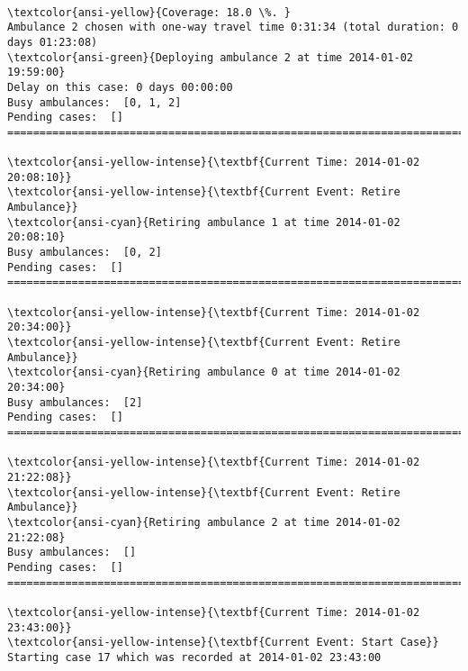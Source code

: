 \documentclass[11pt]{article}
\begin{document}
    \begin{center}
    \end{center}
    { \hspace*{\fill} \\}
    
    \begin{Verbatim}[commandchars=\\\{\}]
\textcolor{ansi-yellow}{Coverage: 18.0 \%. }
Ambulance 2 chosen with one-way travel time 0:31:34 (total duration: 0 days 01:23:08)
\textcolor{ansi-green}{Deploying ambulance 2 at time 2014-01-02 19:59:00}
Delay on this case: 0 days 00:00:00
Busy ambulances:  [0, 1, 2]
Pending cases:  []
========================================================================

\textcolor{ansi-yellow-intense}{\textbf{Current Time: 2014-01-02 20:08:10}}
\textcolor{ansi-yellow-intense}{\textbf{Current Event: Retire Ambulance}}
\textcolor{ansi-cyan}{Retiring ambulance 1 at time 2014-01-02 20:08:10}
Busy ambulances:  [0, 2]
Pending cases:  []
========================================================================

\textcolor{ansi-yellow-intense}{\textbf{Current Time: 2014-01-02 20:34:00}}
\textcolor{ansi-yellow-intense}{\textbf{Current Event: Retire Ambulance}}
\textcolor{ansi-cyan}{Retiring ambulance 0 at time 2014-01-02 20:34:00}
Busy ambulances:  [2]
Pending cases:  []
========================================================================

\textcolor{ansi-yellow-intense}{\textbf{Current Time: 2014-01-02 21:22:08}}
\textcolor{ansi-yellow-intense}{\textbf{Current Event: Retire Ambulance}}
\textcolor{ansi-cyan}{Retiring ambulance 2 at time 2014-01-02 21:22:08}
Busy ambulances:  []
Pending cases:  []
========================================================================

\textcolor{ansi-yellow-intense}{\textbf{Current Time: 2014-01-02 23:43:00}}
\textcolor{ansi-yellow-intense}{\textbf{Current Event: Start Case}}
Starting case 17 which was recorded at 2014-01-02 23:43:00

    \end{Verbatim}

    \begin{center}
    \end{center}
    { \hspace*{\fill} \\}
    
\end{document}
